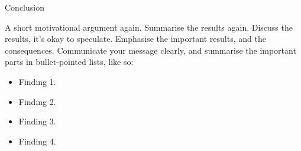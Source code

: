 \begin{section}{Conclusion}\label{sec:Conclusion}

  A short motivational argument again. Summarise the results again.
  Discuss the results, it's okay to speculate.
  Emphasise the important results, and the consequences.
  Communicate your message clearly, and summarise the important parts
  in bullet-pointed lists, like so:

  \begin{itemize}[leftmargin=*]
  \item Finding 1.
  \item Finding 2.
  \item Finding 3.
  \item Finding 4.
  \end{itemize}

\end{section}
